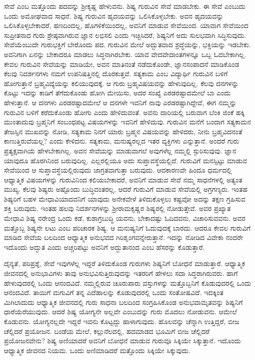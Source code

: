 ಸೇವೆ ಎಂಬ ಮತ್ತೊಂದು ಪದವನ್ನು ಶ‍್ರೀಕೃಷ್ಣ ಹೇಳುವನು. ಶಿಷ್ಯ ಗುರುವಿನ ಸೇವೆ ಮಾಡಬೇಕು. ಈ ಸೇವೆ ಎಂಬುದು ಒಂದು ಅಮೋಘವಾದ ಸಾಧನೆ. ಶಿಷ್ಯ ಗುರುವಿನ ಹೃದಯವನ್ನು ಒಲಿಸಿಕೊಳ್ಳಬೇಕು. ಅವನ ಹೃದಯವನ್ನು ಒಲಿಸಿಕೊಳ್ಳಬೇಕಾದರೆ, ಹಣದಿಂದಲ್ಲ, ಹೊಗಳಿಕೆಯಿಂದಲ್ಲ, ಅವನಿಗೆ ಮಾಡುವ ಸೇವೆಯಿಂದ. ಯಾವಾಗ ಸೇವೆಯಿಂದ ಸುಪ್ರೀತನಾದ ಗುರು ಶ್ರೇಷ್ಠವಾಗಿರುವ ಜ್ಞಾನ ಲಭಿಸಲಿ ಎಂದು ಇಚ್ಛಿಸಿದರೆ, ಶಿಷ್ಯನಿಗೆ ಅದು ಸುಲಭವಾಗಿ ಸಿದ್ಧಿಸುವುದು. ಸೇವೆಯೆಂಬುದೇ ಗುರುಭಕ್ತಿಗೆ ಬೇರೊಂದು ಪದ. ಗುರುವಿನ ಮೇಲೆ ಅದ್ಭುತವಾದ ಶ್ರದ್ಧೆಯನ್ನು, ಭಕ್ತಿಯನ್ನು ಇಡಬೇಕು. ಅವನಿಗಾಗಿ ಏನನ್ನು ಬೇಕಾದರೂ ಮಾಡಲು ಸಿದ್ಧನಾಗಿರಬೇಕು. ಯಾವ ವೇದವೇದಾಂತಗಳನ್ನೂ ಒಬ್ಬ ಓದಬೇಕಾಗಿಲ್ಲ. ಕೇವಲ ಗುರುವಿನ ಸೇವೆಯನ್ನು ಮಾಡಿಯೇ, ಅವನ ಮಾತಿನಂತೆ ನಡೆದುಕೊಂಡೇ, ಜ್ಞಾನಸಂಪಾದನೆ ಮಾಡಿಕೊಂಡ ಕೆಲವು ನಿದರ್ಶನಗಳು ನಮಗೆ ಉಪನಿಷತ್ತಿನಲ್ಲಿ ದೊರಕುತ್ತವೆ. ಸತ್ಯಕಾಮ ಎಂಬ ವಿದ್ಯಾರ್ಥಿ ಗುರುವಿನ ಬಳಿಗೆ ಹೋಗುತ್ತಾನೆ ಬ್ರಹ್ಮವಿದ್ಯೆಯನ್ನು ಕಲಿಯುವುದಕ್ಕೆ. ಆ ಗುರು ಬ್ರಹ್ಮವಿಷಯವನ್ನು ಹೇಳುವುದಿಲ್ಲ. ಕೆಲವು ದನಗಳನ್ನು ಕೊಟ್ಟು ಇದನ್ನು ಕಾಡಿಗೆ ತೆಗೆದುಕೊಂಡು ಹೋಗಿ ಮೇಯಿಸು, ಅದರ ಸಂಖ್ಯೆ ಎರಡರಷ್ಟಾದಮೇಲೆ ಬಾ ಎಂದು ಹೇಳುತ್ತಾನೆ. ಆ ದನಗಳು ಎರಡರಷ್ಟಾದಮೇಲೆ ಆ ದನಗಳೇ ಇವನಿಗೆ ನಾವು ಎರಡರಷ್ಟಾಗಿದ್ದೇವೆ, ಈಗ ನಮ್ಮನ್ನು ಗುರುವಿನ ಬಳಿಗೆ ಕರೆದುಕೊಂಡು ಹೋಗು ಎಂದು ಹೇಳಿದುವಂತೆ. ಅವನು ದಾರಿಯಲ್ಲಿ ಬರುವಾಗ ಬೆಂಕಿ ಜಿಂಕೆ ಹಕ್ಕಿ ಮುಂತಾದುವು ಬ್ರಹ್ಮನಿಗೆ ಸಂಬಂಧಪಟ್ಟ ವಿಷಯಗಳನ್ನು ಇವನಿಗೆ ಹೇಳಿದುವು. ಗುರುವಿನ ಮನೆಗೆ ಬಂದಾಗ ಸತ್ಯಕಾಮನ ತೇಜಸ್ಸಿನ ಮುಖವನ್ನು ನೋಡಿ, ಸತ್ಯಕಾಮ ನಿನಗೆ ಯಾರು ಬ್ರಹ್ಮನ ವಿಷಯವನ್ನು ಹೇಳಿದರು, ನೀನು ಬ್ರಹ್ಮವಿದನಂತೆ ಕಾಣುತ್ತಿರುವೆಯಲ್ಲ? ಎಂದು ಕೇಳಿದನು. ಸತ್ಯಕಾಮ, ಮನುಷ್ಯರಲ್ಲದ ಇತರ ವ್ಯಕ್ತಿಗಳು ಎನ್ನುತ್ತಾನೆ. ಅಂದರೆ ಗುರು ಪ್ರತ್ಯಕ್ಷವಾಗಿಯೆ ಹೇಳಬೇಕಾಗಿಲ್ಲ. ಅವನ ಸೇವೆಯನ್ನು ಮಾಡುವಾಗಲೆ ಅವುಗಳೆಲ್ಲ ನಮ್ಮಲ್ಲಿ ಸ್ಫುರಿಸುವುವು. ಜ್ಞಾನ ಯಾವುದೂ ಹೊರಗಿನಿಂದ ಬರುವುದಿಲ್ಲ. ಎಲ್ಲರಲ್ಲಿಯೂ ಅದು ಸುಪ್ತಾವಸ್ಥೆಯಲ್ಲಿದೆ. ಗುರುವಿಗೆ ಮನಸ್ಸಿಟ್ಟು ಮಾಡುವ ಸೇವೆಯಿಂದ ಆ ಸುಪ್ತಾವಸ್ಥೆಯಲ್ಲಿರುವುದು ಜಾಗ್ರತವಾಗುತ್ತಾ ಬರುವುದು. ಆದಕಾರಣವೇ ಹಿಂದೂ ಧರ್ಮದಲ್ಲಿ ಆಧ್ಯಾತ್ಮಿಕ ವಿಷಯಗಳನ್ನು ಗುರುವಿನಿಂದ ಕಲಿಯಬೇಕಾದರೆ, ಅವನಿಗೆ ಮಾಡುವ ಸೇವೆ ನಮ್ಮ ಸಾಧನೆಗಳಲ್ಲಿ ಅತ್ಯಂತ ಮುಖ್ಯ. ಕೆಲವು ಶಿಷ್ಯರು ಅಷ್ಟೊಂದು ಬುದ್ಧಿವಂತರಲ್ಲ, ಆದರೆ ಗುರುವಿಗೆ ಮಾಡುವ ಸೇವೆಯಲ್ಲಿ ಅಗ್ರಗಣ್ಯರು. ಇಂತಹ ಶಿಷ್ಯರಿಗೆ ಬಹಳ ಮೇಧಾವಿಯಾದವನಿಗೆ ಯಾವುದು ಅನೇಕವೇಳೆ ತಿಳಿದುಕೊಳ್ಳಲು ಕಷ್ಟವೋ ಅದನ್ನು ತಕ್ಷಣ ಗ್ರಹಿಸುವ ಶಕ್ತಿ ಬರುವುದು. ಇಂತಹ ಹಲವು ನಿದರ್ಶನಗಳನ್ನು ಶ‍್ರೀರಾಮಕೃಷ್ಣರ ಶಿಷ್ಯರಲ್ಲಿ ನೋಡುತ್ತೇವೆ. ಅವರ ಪ್ರಖ್ಯಾತ ಮೇಧಾವಿ ಶಿಷ್ಯ ನರೇಂದ್ರ ಒಂದು ಕಡೆ, ಕುಶಾಗ್ರಬುದ್ಧಿ ಯವನು, ಬೇಕಾದಷ್ಟು ಓದಿದವನು, ವಿಚಾರಿಸುವವನು. ಅವರ ಮತ್ತೊಬ್ಬ ಶಿಷ್ಯನೇ ಲಟು ಎಂಬ ಪರಿಚಾರಕ ಶಿಷ್ಯ. ಆ ಮನುಷ್ಯನಿಗೆ ಓದುವುದಕ್ಕೆ ಬಾರದು. ಆದರೂ ಕೇವಲ ಗುರುವಿಗೆ ಮಾಡಿದ ಸೇವೆಯ ಬಲದಿಂದ ಆಧ್ಯಾತ್ಮಿಕ ಅನುಭವದ ಗಿರಿಶೃಂಗವನ್ನೇರುತ್ತಾನೆ. ಇದನ್ನು ನೋಡಿದ ವಿವೇಕಾ ನಂದರೇ ಇದೊಂದು ಅದ್ಭುತ ಎಂದು ಅಚ್ಚರಿಪಟ್ಟು ಅವನಿಗೆ ಅದ್ಭುತಾನಂದ ಎಂಬ ಹೆಸರನ್ನು ಕೊಡುತ್ತಾರೆ.

ದೈನ್ಯತೆ, ಪರಿಪ್ರಶ್ನೆ, ಸೇವೆ ಇವುಗಳೆಲ್ಲ ಇದ್ದರೆ ತಿಳಿದುಕೊಂಡ ಗುರುಗಳು ಶಿಷ್ಯನಿಗೆ ಬೋಧನೆ ಮಾಡುತ್ತಾರೆ. ಆಧ್ಯಾತ್ಮಿಕ ಜೀವನದಲ್ಲಿ ಅನುಭಾವಿಗಳು ತಾವು ಅನುಭವಿಸುತ್ತಿರುವುದನ್ನು ಇತರರಿಗೆ ಹೇಳಲು ಸದಾ ಸಿದ್ಧರಾಗಿರುವರು. ಹಾಗೆ ಹೇಳುವುದರಲ್ಲಿ ಒಂದು ಆನಂದವಿದೆ. ನಮ್ಮಲ್ಲಿರುವ ಚೂರುಪಾರು ವಸ್ತುಗಳನ್ನು ಮತ್ತೊಬ್ಬನಿಗೆ ಕೊಡುವುದರಲ್ಲಿ ಒಂದು ಆನಂದವಿದೆ. ತಾಯಿಗೆ ಮಗುವಿಗೆ ತನ್ನ ಎದೆಹಾಲನ್ನು ಕೊಡುವುದರಲ್ಲಿ ಒಂದು ಸಂತೋಷವಿದೆ. ಇದಕ್ಕಿಂತ ಮಿಗಿಲಾದುದು ಆಧ್ಯಾತ್ಮಿಕ ಜೀವನದಲ್ಲಿ ಗುರು ಸಾಧನಾ ಬಲದಿಂದ ಸಂಗ್ರಹಿಸಿಕೊಂಡ ಅನುಭವಾಮೃತವನ್ನು ಶಿಷ್ಯನಿಗೆ ಧಾರೆಯೆರೆಯುವುದು. ಆದರೆ ಶಿಷ್ಯ ಯೋಗ್ಯನೇ ಅಲ್ಲವೇ ಎಂಬುದನ್ನು ಗುರು ಮೊದಲು ನೋಡುವನು. ಆಮೇಲೆ ಕೊಡುವನು. ಯೋಗ್ಯನಲ್ಲದೇ ಇದ್ದರೆ ಇವನು ಕೊಟ್ಟದ್ದು ಹಾಳಾಗುವುದು. ಹೊಲವನ್ನು ಚೆನ್ನಾಗಿ ಉತ್ತಿದ್ದರೆ, ಬೀಜ ಚೆಲ್ಲಿದರೆ ಪ್ರಯೋಜನ. ಬಂಡೆಯ ಮೇಲೆ, ಕಲ್ಲುನೆಲದಲ್ಲಿ, ಹದಮಾಡದ ಭೂಮಿಗೆ ಬೀಜ ಚೆಲ್ಲಿದರೆ ಪ್ರಯೋಜನವೇನು? ಶಿಷ್ಯ ಅಣಿಯಾದರೆ ಅವನಿಗೆ ಬೋಧನೆ ಮಾಡುವ ಗುರುವೂ ಸಿಕ್ಕಿಯೇ ಸಿಕ್ಕುತ್ತಾನೆ. ಇದೊಂದು ಆಧ್ಯಾತ್ಮಿಕ ಜೀವನದ ನಿಯಮ. ಒಂದು ಅಣಿಮಾಡಿದರೆ ಮತ್ತೊಂದು ಸಿಕ್ಕಿಯೇ ಸಿಕ್ಕುವುದು.

